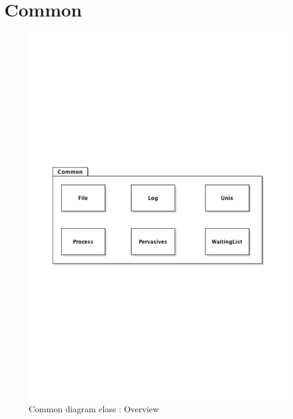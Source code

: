 \section{Common}
	\begin{figure}[ht]
			\begin{center}
				\includegraphics[width=\textwidth,  trim=2cm 10cm 2cm 11cm]{UML_figure/DC/common/DC_Common.pdf}
				\caption{Common diagram class : Overview}
			\end{center}
		\end{figure}







